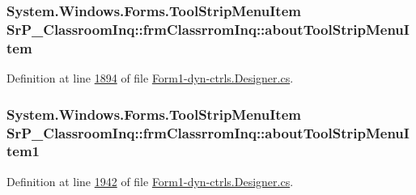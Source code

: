 \hypertarget{class_sr_p___classroom_inq_1_1frm_classrrom_inq_a91d70ebcd0a0ce1237f845c90919cc8b}{
\subsubsection[{about\-Tool\-Strip\-Menu\-Item}]{\setlength{\rightskip}{0pt plus 5cm}\-System.\-Windows.\-Forms.\-Tool\-Strip\-Menu\-Item {\bf \-Sr\-P\-\_\-\-Classroom\-Inq\-::frm\-Classrrom\-Inq\-::about\-Tool\-Strip\-Menu\-Item}}}
\label{class_sr_p___classroom_inq_1_1frm_classrrom_inq_a91d70ebcd0a0ce1237f845c90919cc8b}


\-Definition at line \hyperlink{_form1-dyn-ctrls_8_designer_8cs_source_l01894}{1894} of file \hyperlink{_form1-dyn-ctrls_8_designer_8cs_source}{\-Form1-\/dyn-\/ctrls.\-Designer.\-cs}.

\hypertarget{class_sr_p___classroom_inq_1_1frm_classrrom_inq_ab34838f16ac4c613949fc6e6b18e972d}{
\subsubsection[{about\-Tool\-Strip\-Menu\-Item1}]{\setlength{\rightskip}{0pt plus 5cm}\-System.\-Windows.\-Forms.\-Tool\-Strip\-Menu\-Item {\bf \-Sr\-P\-\_\-\-Classroom\-Inq\-::frm\-Classrrom\-Inq\-::about\-Tool\-Strip\-Menu\-Item1}}}
\label{class_sr_p___classroom_inq_1_1frm_classrrom_inq_ab34838f16ac4c613949fc6e6b18e972d}


\-Definition at line \hyperlink{_form1-dyn-ctrls_8_designer_8cs_source_l01942}{1942} of file \hyperlink{_form1-dyn-ctrls_8_designer_8cs_source}{\-Form1-\/dyn-\/ctrls.\-Designer.\-cs}.

